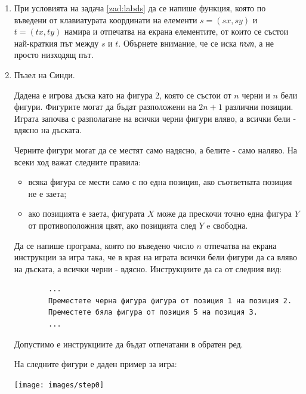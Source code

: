 {\begin{enumerate}[resume]
	която по въведени от клавиатурата координати на елементи $s=(sx,sy)$ и $t=(tx,ty)$ намира \textit {дължината} на най-краткия път между $s$ и $t$. Обърнете внимание, че се иска \textit{път}, а не просто низходящ път.

	\item

	При условията на задача \ref{zad:labds} да се напише функция, която по въведени от клавиатурата координати на елементи $s=(sx,sy)$ и $t=(tx,ty)$ намира и отпечатва на екрана елементите, от които се състои най-краткия път между $s$ и $t$. Обърнете внимание, че се иска \textit{път}, а не просто низходящ път.


	\item Пъзел на Синди\cite{cindy}.

	Дадена е игрова дъска като на фигура 2, която се състои от $n$ черни и $n$ бели фигури. Фигурите могат да бъдат разположени на $2n+1$ различни позиции. Играта започва с разполагане на всички черни фигури вляво, а всички бели - вдясно на дъската.

	Черните фигури могат да се местят само надясно, а белите - само наляво. На всеки ход важат следните правила:


	\begin{itemize}
		\item всяка фигура се мести само с по една позиция, ако съответната позиция не е заета;
		\item ако позицията е заета, фигурата $X$ може да прескочи точно една фигура $Y$ от противоположния цвят, ако позицията след $Y$ e свободна.
	\end{itemize}

	Да се напише програма, която по въведено число $n$ отпечатва на екрана инструкции за игра така, че в края на играта всички бели фигури да са вляво на дъската, а всички черни - вдясно. Инструкциите да са от следния вид:

	\begin{verbatim}
		...
		Преместете черна фигура фигура от позиция 1 на позиция 2.
		Преместете бяла фигура от позиция 5 на позиция 3.
		...
	\end{verbatim}

	Допустимо е инструкциите да бъдат отпечатани в обратен ред.


	\begin{mdframed}[hidealllines=true,backgroundcolor=gray!20]

		На следните фигури е даден пример за игра:

		\begin{flushleft}
		\texttt{[image: images/step0]}


\end{flushleft}
\end{mdframed}
\end{enumerate}}
